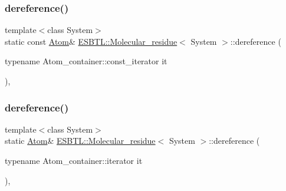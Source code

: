 \subsubsection{\texorpdfstring{dereference()}{dereference()}\hspace{0.1cm}{\footnotesize\ttfamily [1/2]}}
{\footnotesize\ttfamily template$<$class System$>$ \\
static const \hyperlink{classESBTL_1_1Molecular__residue_ac48ca38f130266b0403df294bff016ae}{Atom}\& \hyperlink{classESBTL_1_1Molecular__residue}{E\+S\+B\+T\+L\+::\+Molecular\+\_\+residue}$<$ System $>$\+::dereference (\begin{DoxyParamCaption}\item[{typename Atom\+\_\+container\+::const\+\_\+iterator}]{it }\end{DoxyParamCaption})\hspace{0.3cm}{\ttfamily [inline]}, {\ttfamily [static]}}

\mbox{\label{classESBTL_1_1Molecular__residue_a41c485c4121b1fe4e753b18c22048b19}} 
\subsubsection{\texorpdfstring{dereference()}{dereference()}\hspace{0.1cm}{\footnotesize\ttfamily [2/2]}}
{\footnotesize\ttfamily template$<$class System$>$ \\
static \hyperlink{classESBTL_1_1Molecular__residue_ac48ca38f130266b0403df294bff016ae}{Atom}\& \hyperlink{classESBTL_1_1Molecular__residue}{E\+S\+B\+T\+L\+::\+Molecular\+\_\+residue}$<$ System $>$\+::dereference (\begin{DoxyParamCaption}\item[{typename Atom\+\_\+container\+::iterator}]{it }\end{DoxyParamCaption})\hspace{0.3cm}{\ttfamily [inline]}, {\ttfamily [static]}}

\mbox{\label{classESBTL_1_1Molecular__residue_afea9ebf25f3f5544871a23ec42eba36d}} 
